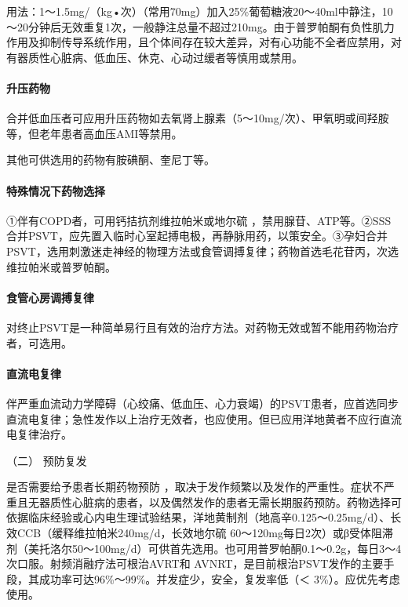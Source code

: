 用法：1～1.5mg/（kg•次）（常用70mg）加入25\%葡萄糖液20～40ml中静注，10～20分钟后无效重复1次，一般静注总量不超过210mg。由于普罗帕酮有负性肌力作用及抑制传导系统作用，且个体间存在较大差异，对有心功能不全者应禁用，对有器质性心脏病、低血压、休克、心动过缓者等慎用或禁用。

\paragraph{升压药物}

合并低血压者可应用升压药物如去氧肾上腺素（5～10mg/次）、甲氧明或间羟胺等，但老年患者高血压AMI等禁用。

其他可供选用的药物有胺碘酮、奎尼丁等。

\paragraph{特殊情况下药物选择}

①伴有COPD者，可用钙拮抗剂维拉帕米或地尔硫{}
，禁用腺苷、ATP等。②SSS合并PSVT，应先置入临时心室起搏电极，再静脉用药，以策安全。③孕妇合并PSVT，选用刺激迷走神经的物理方法或食管调搏复律；药物首选毛花苷丙，次选维拉帕米或普罗帕酮。

\paragraph{食管心房调搏复律}

对终止PSVT是一种简单易行且有效的治疗方法。对药物无效或暂不能用药物治疗者，可选用。

\paragraph{直流电复律}

伴严重血流动力学障碍（心绞痛、低血压、心力衰竭）的PSVT患者，应首选同步直流电复律；急性发作以上治疗无效者，也应使用。但已应用洋地黄者不应行直流电复律治疗。

\hypertarget{text00289.htmlux5cux23CHP10-2-2-3-1-2}{}
（二） 预防复发

是否需要给予患者长期药物预防
，取决于发作频繁以及发作的严重性。症状不严重且无器质性心脏病的患者，以及偶然发作的患者无需长期服药预防。药物选择可依据临床经验或心内电生理试验结果，洋地黄制剂（地高辛0.125～0.25mg/d）、长效CCB（缓释维拉帕米240mg/d，长效地尔硫{}
60～120mg每日2次）或β受体阻滞剂（美托洛尔50～100mg/d）可供首先选用。也可用普罗帕酮0.1～0.2g，每日3～4次口服。射频消融疗法可根治AVRT和
AVNRT，是目前根治PSVT发作的主要手段，其成功率可达96\%～99\%。并发症少，安全，复发率低（＜
3\%）。应优先考虑使用。


